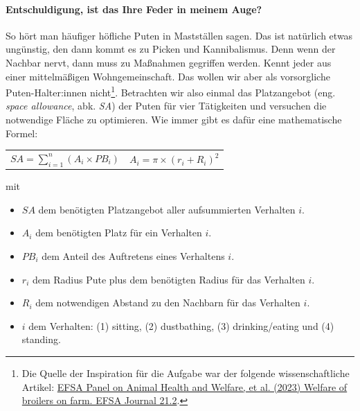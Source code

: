 \documentclass[a4paper, 9pt]{scrartcl}\usepackage[]{graphicx}\usepackage[]{xcolor}
\begin{document}
\paragraph{Entschuldigung, ist das Ihre Feder in meinem Auge?}



So h{\"o}rt man h{\"a}ufiger h{\"o}fliche Puten in Mastst{\"a}llen sagen. Das
ist nat{\"u}rlich etwas ung{\"u}nstig, den dann kommt es zu Picken und
Kannibalismus. Denn wenn der Nachbar nervt, dann muss zu Ma{\ss}nahmen
gegriffen werden. Kennt jeder aus einer mittelm{\"a}{\ss}igen Wohngemeinschaft. Das
wollen wir aber als vorsorgliche Puten-Halter:innen
nicht\footnote{Die Quelle der Inspiration f{\"u}r die Aufgabe war der folgende
  wissenschaftliche Artikel:
  \href{https://www.efsa.europa.eu/en/efsajournal/pub/7788}{EFSA Panel on
    Animal Health and Welfare, et al. (2023) Welfare of broilers on
    farm. EFSA Journal 21.2}.}. Betrachten wir also einmal das Platzangebot
(eng. \textit{space allowance}, abk. \textit{SA}) der Puten
f{\"u}r vier T{\"a}tigkeiten und versuchen die notwendige Fl{\"a}che zu optimieren. Wie
immer gibt es daf{\"u}r eine mathematische Formel:


\begin{center}
  \begin{tabular}{cc}
    $SA = \sum^n_{i = 1} (A_i \times PB_i)$ & $A_i = \pi \times (r_i + R_i)^2$\\
  \end{tabular}
\end{center}

\vspace{-2Ex}

mit

\begin{itemize}[noitemsep]
\item $SA$ dem ben{\"o}tigten Platzangebot aller aufsummierten Verhalten $i$.
\item $A_i$ dem ben{\"o}tigten Platz f{\"u}r ein Verhalten $i$. 
\item $PB_i$ dem Anteil des Auftretens eines Verhaltens $i$.
\item $r_i$ dem Radius Pute plus dem ben{\"o}tigten Radius f{\"u}r das Verhalten $i$.
\item $R_i$ dem notwendigen Abstand zu den Nachbarn f{\"u}r das Verhalten $i$.    
\item $i$ dem Verhalten: (1) sitting, (2) dustbathing, (3)
  drinking/eating und (4) standing.
\end{itemize}
\end{document}
